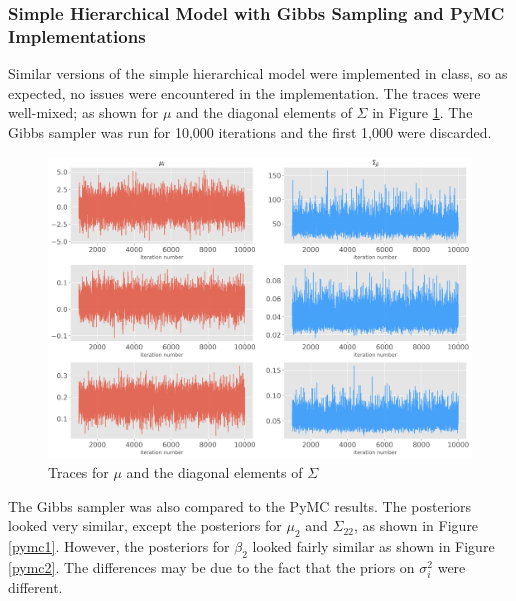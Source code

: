 \documentclass[paper=a4, fontsize=11pt]{scrartcl}
\begin{document}
\subsubsection{Simple Hierarchical Model with Gibbs Sampling and PyMC Implementations}
Similar versions of the simple hierarchical model were implemented in class, so as expected, no issues were encountered in the implementation. The traces were well-mixed; as shown for $\mu$ and the diagonal elements of $\Sigma$ in Figure  \ref{traces}. The Gibbs sampler was run for 10,000 iterations and the first 1,000 were discarded.\\

\begin{figure}[!htb]\label{traces}
\centering
\includegraphics[width=1\textwidth]{project/writeup/traces_simple_model.png}
\caption{Traces for $\mu$ and the diagonal elements of $\Sigma$}
\end{figure}

The Gibbs sampler was also compared to the PyMC results. The posteriors looked very similar, except the posteriors for $\mu_2$ and $\Sigma_{22}$, as shown in Figure \ref{pymc1}. However, the posteriors for $\beta_2$ looked fairly similar as shown in Figure \ref{pymc2}. The differences may be due to the fact that the priors on $\sigma^2_i$ were different.
\end{document}
